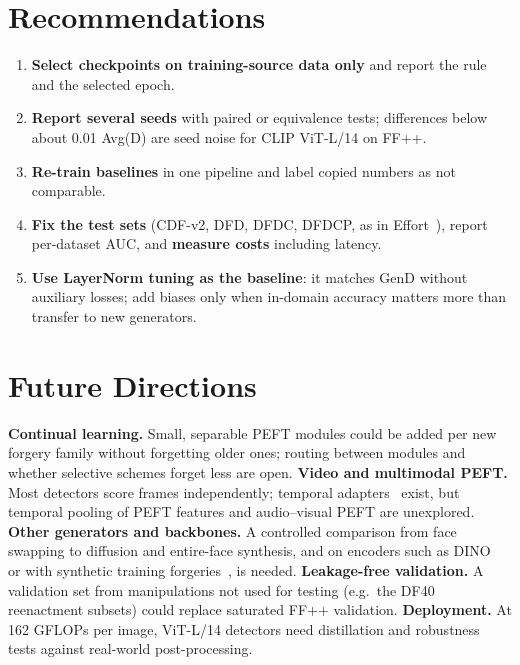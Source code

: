 \documentclass[fonts]{icst}
\begin{document}
\section{Recommendations}
\label{sec:recommend}
\begin{enumerate}[leftmargin=*, topsep=2pt, itemsep=1pt]
    \item \textbf{Select checkpoints on training-source data only} and report the rule and the selected epoch.
    \item \textbf{Report several seeds} with paired or equivalence tests; differences below about 0.01 Avg(D) are seed noise for CLIP ViT-L/14 on FF++.
    \item \textbf{Re-train baselines} in one pipeline and label copied numbers as not comparable.
    \item \textbf{Fix the test sets} (CDF-v2, DFD, DFDC, DFDCP, as in Effort~\cite{yan2025effort}), report per-dataset AUC, and \textbf{measure costs} including latency.
    \item \textbf{Use LayerNorm tuning as the baseline}: it matches GenD without auxiliary losses; add biases only when in-domain accuracy matters more than transfer to new generators.
\end{enumerate}

\section{Future Directions}
\label{sec:open}
\textbf{Continual learning.} Small, separable PEFT modules could be added per new forgery family without forgetting older ones; routing between modules and whether selective schemes forget less are open.
\textbf{Video and multimodal PEFT.} Most detectors score frames independently; temporal adapters~\cite{han2024fcg} exist, but temporal pooling of PEFT features and audio--visual PEFT are unexplored.
\textbf{Other generators and backbones.} A controlled comparison from face swapping to diffusion and entire-face synthesis, and on encoders such as DINO~\cite{caron2021emerging} or with synthetic training forgeries~\cite{shiohara2022sbi}, is needed.
\textbf{Leakage-free validation.} A validation set from manipulations not used for testing (e.g.\ the DF40 reenactment subsets) could replace saturated FF++ validation.
\textbf{Deployment.} At 162 GFLOPs per image, ViT-L/14 detectors need distillation and robustness tests against real-world post-processing.
\end{document}
